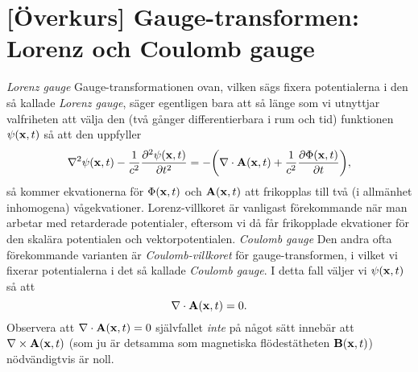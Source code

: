 \section{[{\"O}verkurs] Gauge-transformen: Lorenz och Coulomb gauge}
\medskip
\noindent
{\it Lorenz gauge}
\medskip
\noindent
Gauge-transformationen ovan, vilken s{\"a}gs fixera potentialerna i den s{\aa}
kallade {\it Lorenz gauge},
s{\"a}ger egentligen bara att s{\aa} l{\"a}nge som vi utnyttjar valfriheten att
v{\"a}lja den (tv{\aa} g{\aa}nger differentierbara i rum och tid) funktionen
$\psi({\bf x},t)$ s{\aa} att den uppfyller
$$
  \nabla^2\psi({\bf x},t)
    -{{1}\over{c^2}}{{\partial^2\psi({\bf x},t)}\over{\partial t^2}}
  =-\bigg(
      \nabla\cdot{\bf A}({\bf x},t)
        +{{1}\over{c^2}}{{\partial\Phi({\bf x},t)}\over{\partial t}}
     \bigg),
$$
s{\aa} kommer ekvationerna f{\"o}r $\Phi({\bf x},t)$ och ${\bf A}({\bf x},t)$
att frikopplas till tv{\aa} (i allm{\"a}nhet inhomogena) v{\aa}gekvationer.
Lorenz-villkoret {\"a}r vanligast f{\"o}rekommande n{\"a}r man arbetar med
retarderade potentialer, eftersom vi d{\aa} f{\aa}r frikopplade ekvationer
f{\"o}r den skal{\"a}ra potentialen och
vektorpotentialen.
\medskip
\noindent
{\it Coulomb gauge}
\medskip
\noindent
Den andra ofta f{\"o}rekommande varianten {\"a}r {\it Coulomb-villkoret}
f{\"o}r gauge-transformen, i vilket vi fixerar potentialerna i det s{\aa}
kallade {\it Coulomb gauge}. I detta fall v{\"a}ljer vi $\psi({\bf x},t)$
s{\aa} att
$$
  \nabla\cdot{\bf A}({\bf x},t)=0.
$$
Observera att $\nabla\cdot{\bf A}({\bf x},t)=0$ sj{\"a}lvfallet {\it inte}
p{\aa} n{\aa}got s{\"a}tt inneb{\"a}r att $\nabla\times{\bf A}({\bf x},t)$
(som ju {\"a}r detsamma som magnetiska fl{\"o}dest{\"a}theten
${\bf B}({\bf x},t)$) n{\"o}dv{\"a}ndigtvis {\"a}r noll.

